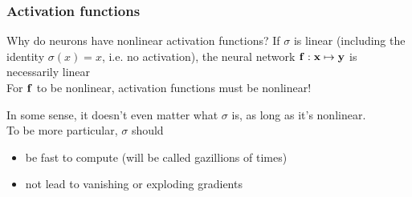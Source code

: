 \begin{frame}
    \frametitle{Activation functions}
    \begin{block}{Why do neurons have nonlinear activation functions?}
        If $\sigma$ is linear (including the identity $\sigma(x) = x$, i.e. no activation), the neural network $\mathbf{f} : \mathbf{x} \mapsto \mathbf{y}$ is necessarily linear \\[1ex]
        For $\mathbf{f}$ to be nonlinear, \alert{activation functions must be nonlinear}!
    \end{block}

    In some sense, it doesn't even matter what $\sigma$ is, as long as it's nonlinear. \\[1ex]

    To be more particular, $\sigma$ should
    \begin{itemize}
        \item be fast to compute (will be called gazillions of times)
        \item not lead to vanishing or exploding gradients
    \end{itemize}
\end{frame}

